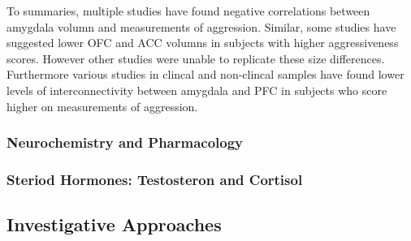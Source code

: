 To summaries, multiple studies have found negative correlations between amygdala volumn and measurements of aggression. 
Similar, some studies have suggested lower OFC and ACC volumns in subjects with higher aggressiveness scores.
However other studies were unable to replicate these size differences.
Furthermore various studies in clincal and non-clincal samples have found lower levels of interconnectivity between amygdala and PFC in subjects who score higher on measurements of aggression.



\subsubsection{Neurochemistry and Pharmacology}
\label{ssub:neurochemistry_and_pharmacology}

\subsubsection{Steriod Hormones: Testosteron and Cortisol}
\label{ssub:steriod_hormones_testosteron_and_cortisol}

\subsection{Investigative Approaches}
\label{sub:investigation_approaches}


